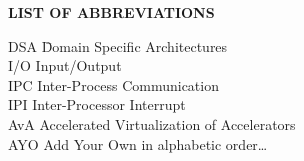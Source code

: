 {}

\begin{center}
{\normalfont \textbf{LIST OF ABBREVIATIONS}}
\end{center}

\newcommand{\Ab}[2]{\noindent  #1 \> #2 \\}
\newcommand{\Abi}[2]{\noindent #1 \hspace{1.5cm} \= #2 \\}

\begin{tabbing}
\Abi{DSA}{Domain Specific Architectures}
\Ab{I/O}{Input/Output}
\Ab{IPC}{Inter-Process Communication}
\Ab{IPI}{Inter-Processor Interrupt}
\Ab{AvA}{Accelerated Virtualization of Accelerators}
\Ab{AYO}{Add Your Own in alphabetic order\ldots}
\end{tabbing}

\clearpage
